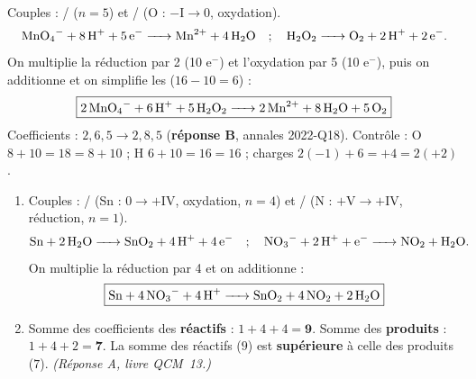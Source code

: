 \documentclass[11pt,a4paper]{article}
\begin{document}
\begin{corr}
Couples : / ($n=5$) et / (O : $-\mathrm{I}\to 0$, oxydation).
\[
\ce{MnO4^- + 8 H+ + 5 e^- -> Mn^{2+} + 4 H2O} \quad ; \quad \ce{H2O2 -> O2 + 2 H+ + 2 e^-}.
\]
On multiplie la réduction par 2 (10 e$^-$) et l'oxydation par 5 (10 e$^-$), puis on additionne et on
simplifie les  ($16-10=6$) :
\[
\boxed{\ce{2 MnO4^- + 6 H+ + 5 H2O2 -> 2 Mn^{2+} + 8 H2O + 5 O2}}
\]
Coefficients : $2,6,5 \to 2,8,5$ (\textbf{réponse B}, annales 2022-Q18). Contrôle : O $8+10=18=8+10$ ;
H $6+10=16=16$ ; charges $2(-1)+6=+4=2(+2)$. \checkmark
\end{corr}

\begin{corr}
\begin{enumerate}[label=(\alph*),leftmargin=2em,topsep=1pt,itemsep=1.5pt]
  \item Couples : / (Sn : $0\to+\mathrm{IV}$, oxydation, $n=4$) et /
        (N : $+\mathrm{V}\to+\mathrm{IV}$, réduction, $n=1$).
        \[
        \ce{Sn + 2 H2O -> SnO2 + 4 H+ + 4 e^-} \quad ; \quad \ce{NO3^- + 2 H+ + e^- -> NO2 + H2O}.
        \]
        On multiplie la réduction par 4 et on additionne :
        \[
        \boxed{\ce{Sn + 4 NO3^- + 4 H+ -> SnO2 + 4 NO2 + 2 H2O}}
        \]
  \item Somme des coefficients des \textbf{réactifs} : $1+4+4=\mathbf{9}$.
        Somme des \textbf{produits} : $1+4+2=\mathbf{7}$.
        La somme des réactifs ($9$) est \textbf{supérieure} à celle des produits ($7$).
        \emph{(Réponse A, livre QCM~13.)}
\end{enumerate}
\end{corr}
\end{document}
